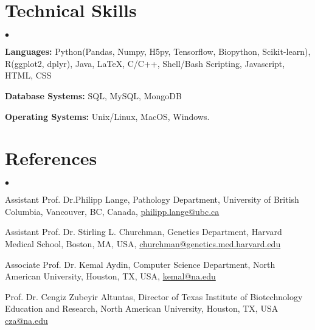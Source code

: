 \documentclass[margin,line]{res}
\newenvironment{list2}{
  \begin{list}{$\bullet$}{%
      \setlength{\itemsep}{0in}
      \setlength{\parsep}{0in} \setlength{\parskip}{0in}
      \setlength{\topsep}{0in} \setlength{\partopsep}{0in} 
      \setlength{\leftmargin}{0.2in}}}{\end{list}}
\begin{document}
\begin{resume}
\section{\sc Technical Skills} 
\begin{list2}
\item {\bf Languages:}  Python(Pandas, Numpy, H5py, Tensorflow, Biopython, Scikit-learn), R(ggplot2, dplyr), Java, \LaTeX, C/C++, Shell/Bash Scripting, Javascript, HTML, CSS
\item {\bf Database Systems:} SQL, MySQL, MongoDB
\item {\bf Operating Systems:}  Unix/Linux, MacOS, Windows.
\end{list2}

\section{\sc References} 
\begin{list2}
\item Assistant Prof. Dr.Philipp Lange, Pathology Department, University of British Columbia, Vancouver, BC, Canada, \href{philipp.lange@ubc.ca}{philipp.lange@ubc.ca}
\item Assistant Prof. Dr. Stirling L. Churchman, Genetics Department, Harvard Medical School, Boston, MA, USA, \href{churchman@genetics.med.harvard.edu}{churchman@genetics.med.harvard.edu}
\item Associate Prof. Dr. Kemal Aydin, Computer Science Department, North American University, Houston, TX, USA, \href{kemal@na.edu}{kemal@na.edu}
\item Prof. Dr. Cengiz Zubeyir Altuntas, Director of Texas Institute of Biotechnology Education and Research, North American University, Houston, TX, USA \href{cza@na.edu}{cza@na.edu} 
\end{list2}


\end{resume}
\end{document}
